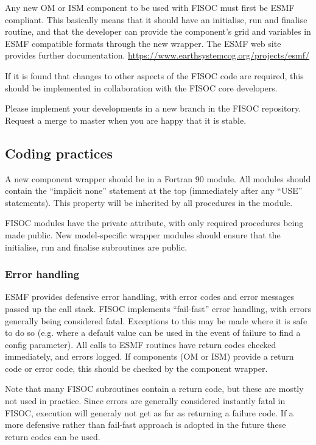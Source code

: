 \documentclass[12pt]{article}
\begin{document}
Any new OM or ISM component to be used with FISOC must first be ESMF compliant.  This basically 
means that it should have an initialise, run and finalise routine, and that the developer can 
provide the component's grid and variables in ESMF compatible formats through the new wrapper.
The ESMF web site provides further documentation.
\url{https://www.earthsystemcog.org/projects/esmf/}

If it is found that changes to other aspects of the FISOC code are required, this should be 
implemented in collaboration with the FISOC core developers.

Please implement your developments in a new branch in the FISOC repository. 
Request a merge to master when you are happy that it is stable. 




\subsection{Coding practices}

A new component wrapper  should be in a Fortran 90 module.  
All modules should contain the ``implicit none'' statement at the top (immediately after any 
``USE'' statements).  This property will be inherited by all procedures in the module.

FISOC modules have the private attribute, with only required procedures being 
made public. 
New model-specific wrapper modules should ensure that the initialise, run and finalise 
subroutines are public. 



\subsubsection{Error handling}

ESMF provides defensive error handling, with error codes and error messages passed up the 
call stack. 
FISOC implements ``fail-fast'' error handling, with errors generally being considered 
fatal. 
Exceptions to this may be made where it is safe to do so (e.g. where a default value can be 
used in the event of  failure to find a config parameter).
All calls to ESMF routines have return codes checked immediately, and errors logged.
If components (OM or ISM) provide a return code or error code, 
this should be checked by the component wrapper.

Note that many FISOC subroutines contain a return code, but these are mostly not used in 
practice.  Since errors are generally considered instantly fatal in FISOC, execution will 
generaly not get as far as returning a failure code. 
If a more defensive rather than fail-fast approach is adopted in the future these return 
codes can be used.
\end{document}
